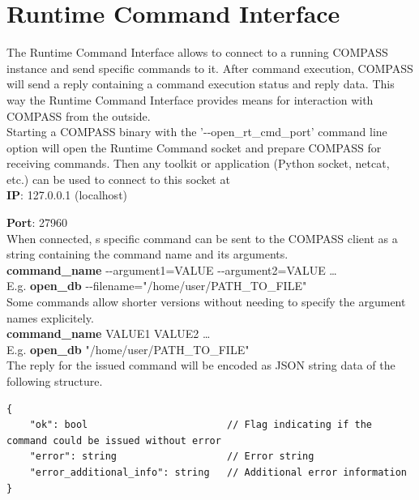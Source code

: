 
\section{Runtime Command Interface}
\label{sec:rtcommand_interface}

The Runtime Command Interface allows to connect to a running COMPASS instance and send 
specific commands to it. After command execution, COMPASS will send a reply
containing a command execution status and reply data. This way 
the Runtime Command Interface provides means for interaction with COMPASS from the outside. \\

Starting a COMPASS binary with the '-{}-open\_rt\_cmd\_port' command line option will open the Runtime Command socket
and prepare COMPASS for receiving commands. Then any toolkit or application (Python socket, netcat, etc.)
can be used to connect to this socket at \\

\textbf{IP}: 127.0.0.1 (localhost)

\textbf{Port}: 27960 \\

When connected, s specific command can be sent to the COMPASS client as a string containing the command name and its arguments. \\

\textbf{command\_name} -{}-argument1=VALUE -{}-argument2=VALUE \dots \\

E.g. \textbf{open\_db} -{}-filename="/home/user/PATH\_TO\_FILE" \\

Some commands allow shorter versions without needing to specify the argument names explicitely. \\

\textbf{command\_name} VALUE1 VALUE2 \dots \\

E.g. \textbf{open\_db} "/home/user/PATH\_TO\_FILE" \\

The reply for the issued command will be encoded as JSON string data of the following structure.

\begin{lstlisting}[basicstyle=\small\ttfamily]
{
    "ok": bool                        // Flag indicating if the command could be issued without error 
    "error": string                   // Error string
    "error_additional_info": string   // Additional error information
}
\end{lstlisting}

